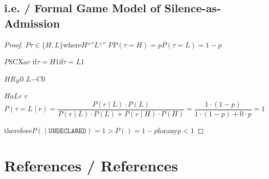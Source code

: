 \documentclass[12pt,a4paper]{article}
\theoremstyle{remark}
\newcommand{\undeclared}{\texttt{UNDECLARED}}
\begin{document}
\subsection{i.e. / Formal Game Model of Silence-as-Admission}

\begin{proof}
$P$$\tau \in \{H, L\}$where$H$``''$L$``''
$P$$P(\tau = H) = p$$P(\tau = L) = 1-p$

$P$SCX$a$$r$
if$\tau = H$$1$if$\tau = L$$1$

$H$$R_H$$0$
$L$$-C$$0$

$H$$a$$L$$r$
$r$
\begin{equation}
    P(\tau = L \mid r) = \frac{P(r \mid L) \cdot P(L)}{P(r \mid L) \cdot P(L) + P(r \mid H) \cdot P(H)} = \frac{1 \cdot (1-p)}{1 \cdot (1-p) + 0 \cdot p} = 1
\end{equation}

therefore$P(\text{} \mid \undeclared) = 1 > P(\text{}) = 1-p$forany$p < 1$
\end{proof}

\section*{References / References}
\end{document}
